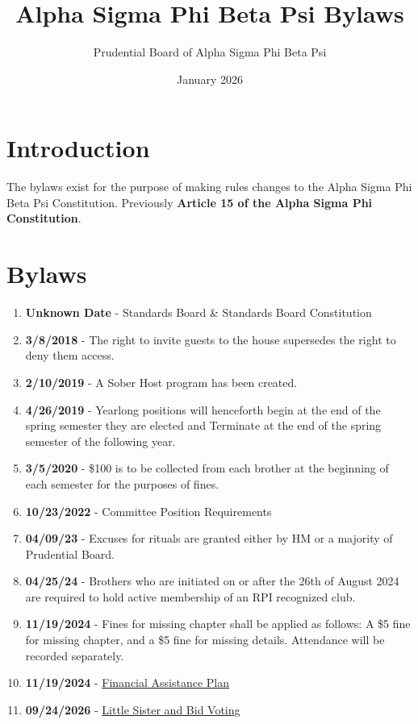 \documentclass{article}
\title{Alpha Sigma Phi Beta Psi Bylaws}
\author{Prudential Board of Alpha Sigma Phi Beta Psi}
\date{January 2026}
\begin{document}
\maketitle

\section*{Introduction}

The bylaws exist for the purpose of making rules changes to the Alpha Sigma Phi Beta Psi Constitution. Previously \textbf{Article 15 of the Alpha Sigma Phi Constitution}.

\section*{Bylaws}
\begin{enumerate}
    \item \textbf{Unknown Date} - Standards Board \& Standards Board Constitution
    \item \textbf{3/8/2018} - The right to invite guests to the house supersedes the right to deny them access.
    \item \textbf{2/10/2019} - A Sober Host program has been created.
    \item \textbf{4/26/2019} - Yearlong positions will henceforth begin at the end of the spring semester they are elected and Terminate at the end of the spring semester of the following year.
    \item \textbf{3/5/2020} - \$100 is to be collected from each brother at the beginning of each semester for the purposes of fines.
    \item \textbf{10/23/2022} - Committee Position Requirements
    \item \textbf{04/09/23} - Excuses for rituals are granted either by HM or a majority of Prudential Board.
    \item \textbf{04/25/24} - Brothers who are initiated on or after the 26th of August 2024 are required to hold active membership of an RPI recognized club.
    \item \textbf{11/19/2024} - Fines for missing chapter shall be applied as follows: A \$5 fine for missing chapter, and a \$5 fine for missing details. Attendance will be recorded separately.
    \item \textbf{11/19/2024} - \href{./Zachary_Polo_Financial_Assistance_Plan.pdf}{Financial Assistance Plan}
    \item \textbf{09/24/2026} - \href{./Little_Sister_and_Bid_Voting.pdf}{Little Sister and Bid Voting}
\end{enumerate}
\end{document}
